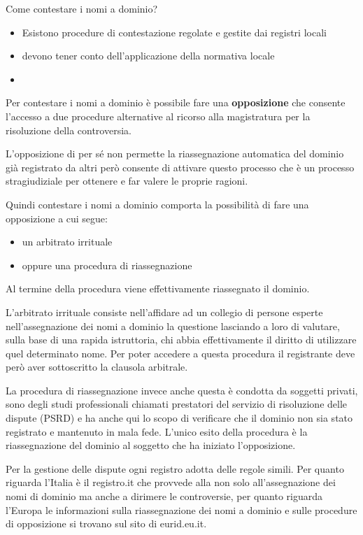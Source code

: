       Come contestare i nomi a dominio? 
      \begin{itemize}
          \item Esistono procedure di contestazione regolate e gestite dai registri locali 
          \item devono tener conto dell'applicazione della normativa locale 
          \item 
      \end{itemize}
      
       Per contestare i nomi a dominio è possibile fare una \textbf{opposizione} che consente l'accesso a due procedure alternative al ricorso alla magistratura per la risoluzione della controversia. \par
       L'opposizione di per sé non permette la riassegnazione automatica del dominio già registrato da altri però consente di attivare questo processo che è un processo stragiudiziale per ottenere e far valere le proprie ragioni. \par
       Quindi contestare i nomi a dominio comporta la possibilità di fare una opposizione a cui segue: 
       \begin{itemize}
           \item un arbitrato irrituale 
           \item oppure una procedura di riassegnazione 
       \end{itemize}
       
Al termine della procedura viene effettivamente riassegnato il dominio. \par 
L'arbitrato irrituale consiste nell'affidare ad un collegio di persone esperte nell'assegnazione dei nomi a dominio la questione lasciando a loro di valutare, sulla base di una rapida istruttoria, chi abbia effettivamente il diritto di utilizzare quel determinato nome. Per poter accedere a questa procedura il registrante deve però aver sottoscritto la clausola arbitrale. \par 
La procedura di riassegnazione invece anche questa è condotta da soggetti privati, sono degli studi professionali chiamati prestatori del servizio di risoluzione delle dispute (PSRD) e ha anche qui lo scopo di verificare che il dominio non sia stato registrato e mantenuto in mala fede. L'unico esito della procedura è la riassegnazione del dominio al soggetto che ha iniziato l'opposizione.\par 
       
Per la gestione delle dispute ogni registro adotta delle regole simili. Per quanto riguarda l'Italia è il registro.it che provvede alla non solo all'assegnazione dei nomi di dominio ma anche a dirimere le controversie, per quanto riguarda l'Europa le informazioni sulla riassegnazione dei nomi a dominio e sulle procedure di opposizione si trovano sul sito di eurid.eu.it.\par 


